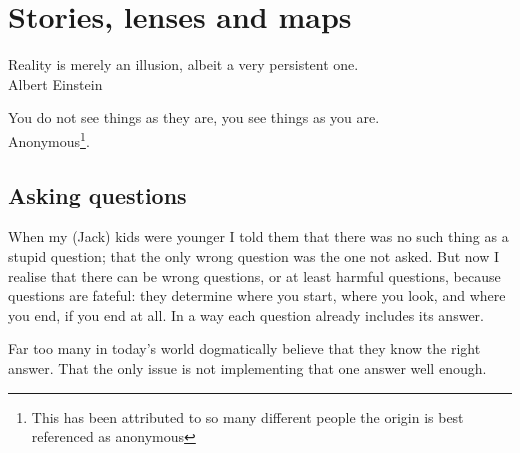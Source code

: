 ﻿%
\chapter{Stories, lenses and maps}
\label{chapter:emergence-einstein-picasso}


\begin{chapterquotation}
Reality is merely an illusion, albeit a very persistent one.\\
\raggedleft\textemdash Albert Einstein


\centering
You do not see things as they are, you see things as you are.\\
\raggedleft\textemdash Anonymous\footnote{This has been attributed to so many different people the origin is best referenced as anonymous}.
\end{chapterquotation}




\section{Asking questions}
\begin{longstoryblock}
When my (Jack) kids were younger I told them that there was no such thing as a stupid question; that the only wrong question was the one not asked. But now I realise that there can be wrong questions, or at least harmful questions, because questions are fateful: they determine where you start, where you look, and where you end, if you end at all. In a way each question already includes its answer. 
\end{longstoryblock}


Far too many in today's world dogmatically believe that they know the right answer. That the only issue is not implementing that one answer well enough. 


